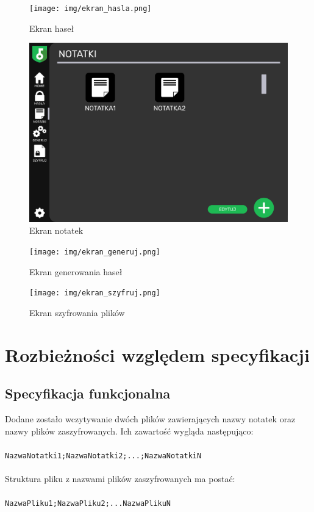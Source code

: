 \documentclass[a4paper]{article}
\newcommand{\prog}{\texttt}
\begin{document}
\begin{figure}[H]
    \centering
    \texttt{[image: img/ekran\_hasla.png]}
    \caption{Ekran haseł}
\end{figure}

\begin{figure}[H]
    \centering
    \includegraphics[width=1\textwidth]{img/ekran_notatek.png}
    \caption{Ekran notatek}
\end{figure}

\begin{figure}[H]
    \centering
    \texttt{[image: img/ekran\_generuj.png]}
    \caption{Ekran generowania haseł}
\end{figure}

\begin{figure}[H]
    \centering
    \texttt{[image: img/ekran\_szyfruj.png]}
    \caption{Ekran szyfrowania plików}
\end{figure}

\section{Rozbieżności względem specyfikacji}
\subsection{Specyfikacja funkcjonalna}
Dodane zostało wczytywanie dwóch plików zawierających nazwy notatek oraz nazwy plików zaszyfrowanych. Ich zawartość wygląda następująco:\\ \\
\prog{NazwaNotatki1;NazwaNotatki2;...;NazwaNotatkiN}\\ \\
Struktura pliku z nazwami plików zaszyfrowanych ma postać:\\ \\
\prog{NazwaPliku1;NazwaPliku2;...NazwaPlikuN}
\end{document}
